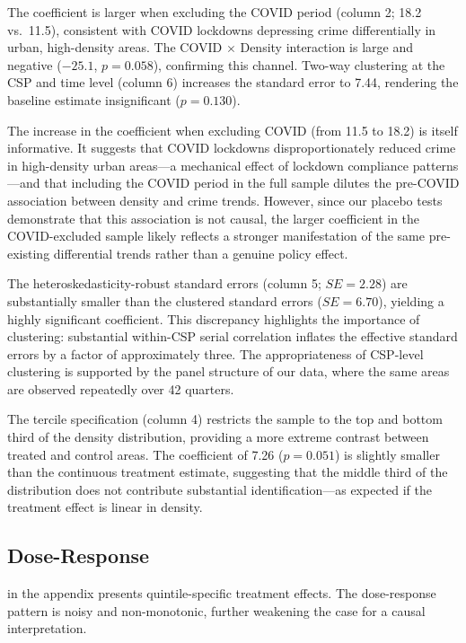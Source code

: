 \documentclass[12pt]{article}
\begin{document}
The coefficient is larger when excluding the COVID period (column 2; 18.2 vs.\ 11.5), consistent with COVID lockdowns depressing crime differentially in urban, high-density areas. The COVID $\times$ Density interaction is large and negative ($-25.1$, $p = 0.058$), confirming this channel. Two-way clustering at the CSP and time level (column 6) increases the standard error to 7.44, rendering the baseline estimate insignificant ($p = 0.130$).

The increase in the coefficient when excluding COVID (from 11.5 to 18.2) is itself informative. It suggests that COVID lockdowns disproportionately reduced crime in high-density urban areas---a mechanical effect of lockdown compliance patterns---and that including the COVID period in the full sample dilutes the pre-COVID association between density and crime trends. However, since our placebo tests demonstrate that this association is not causal, the larger coefficient in the COVID-excluded sample likely reflects a stronger manifestation of the same pre-existing differential trends rather than a genuine policy effect.

The heteroskedasticity-robust standard errors (column 5; $SE = 2.28$) are substantially smaller than the clustered standard errors ($SE = 6.70$), yielding a highly significant coefficient. This discrepancy highlights the importance of clustering: substantial within-CSP serial correlation inflates the effective standard errors by a factor of approximately three. The appropriateness of CSP-level clustering is supported by the panel structure of our data, where the same areas are observed repeatedly over 42 quarters.

The tercile specification (column 4) restricts the sample to the top and bottom third of the density distribution, providing a more extreme contrast between treated and control areas. The coefficient of 7.26 ($p = 0.051$) is slightly smaller than the continuous treatment estimate, suggesting that the middle third of the distribution does not contribute substantial identification---as expected if the treatment effect is linear in density.

\subsection{Dose-Response}

 in the appendix presents quintile-specific treatment effects. The dose-response pattern is noisy and non-monotonic, further weakening the case for a causal interpretation.
\end{document}

